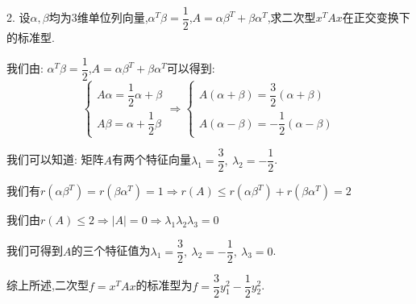 2. 设$\alpha, \beta$均为$3$维单位列向量,$\alpha^{T}\beta=\dfrac{1}{2}$,$A=\alpha\beta^{T}+\beta\alpha^{T}$,求二次型$x^{T}Ax$在正交变换下的标准型.
\begin{solution}
	
	我们由: $\alpha^{T}\beta=\dfrac{1}{2}$,$A=\alpha\beta^{T}+\beta\alpha^{T}$可以得到: 
	$$\left\lbrace
	\begin{array}{l}
		A\alpha=\dfrac{1}{2}\alpha+\beta\\
		A\beta=\alpha+\dfrac{1}{2}\beta
	\end{array}
	\right. \Rightarrow \left\lbrace
	\begin{array}{l}
		A(\alpha+\beta)=\dfrac{3}{2}(\alpha+\beta)\\
		A(\alpha-\beta)=-\dfrac{1}{2}(\alpha-\beta)
	\end{array}
	\right. $$
	
	我们可以知道: 矩阵$A$有两个特征向量$\lambda_{1}=\dfrac{3}{2},\ \lambda_{2}=-\dfrac{1}{2}$.
	
	我们有$r(\alpha\beta^{T})=r(\beta\alpha^{T})=1\Rightarrow r(A)\leq r(\alpha\beta^{T})+r(\beta\alpha^{T})=2$
	
	我们由$r(A)\leq 2\Rightarrow |A|=0\Rightarrow \lambda_{1}\lambda_{2}\lambda_{3}=0$
	
	我们可得到$A$的三个特征值为$\lambda_{1}=\dfrac{3}{2},\ \lambda_{2}=-\dfrac{1}{2},\ \lambda_{3}=0$.
	
	综上所述,二次型$f=x^{T}Ax$的标准型为$f=\dfrac{3}{2}y_{1}^2-\dfrac{1}{2}y_{2}^{2}$.
\end{solution}
